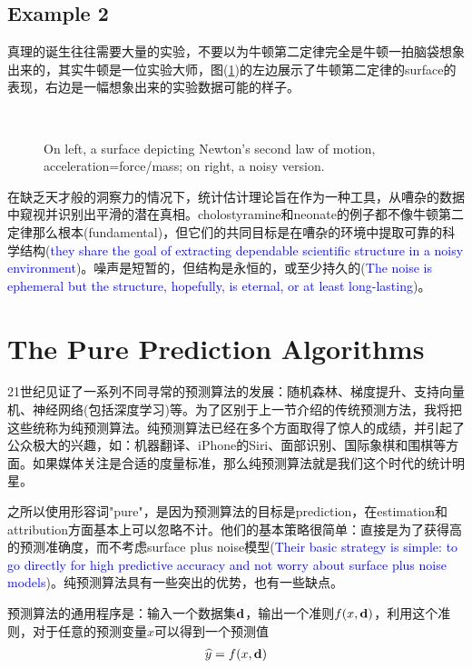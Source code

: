 \documentclass[lang=cn,11pt,a4paper,cite=authoryear]{elegantpaper}
\begin{document}
\subsection{Example 2}
真理的诞生往往需要大量的实验，不要以为牛顿第二定律完全是牛顿一拍脑袋想象出来的，其实牛顿是一位实验大师，图(\ref{fig2})的左边展示了牛顿第二定律的surface的表现，右边是一幅想象出来的实验数据可能的样子。
\begin{figure}[H]
		\centering
		\\
		\caption{On left, a surface depicting Newton's second law of motion, acceleration=force/mass; on right, a noisy version.}
		\label{fig2}
\end{figure}

在缺乏天才般的洞察力的情况下，统计估计理论旨在作为一种工具，从嘈杂的数据中窥视并识别出平滑的潜在真相。cholostyramine和neonate的例子都不像牛顿第二定律那么根本(fundamental)，但它们的共同目标是在嘈杂的环境中提取可靠的科学结构(\textcolor{blue}{they share the goal of extracting dependable scientific structure in a noisy environment})。噪声是短暂的，但结构是永恒的，或至少持久的(\textcolor{blue}{The noise is ephemeral but the structure, hopefully, is eternal, or at least long-lasting})。

\section{The Pure Prediction Algorithms}

21世纪见证了一系列不同寻常的预测算法的发展：随机森林、梯度提升、支持向量机、神经网络(包括深度学习)等。为了区别于上一节介绍的传统预测方法，我将把这些统称为纯预测算法。纯预测算法已经在多个方面取得了惊人的成绩，并引起了公众极大的兴趣，如：机器翻译、iPhone的Siri、面部识别、国际象棋和围棋等方面。如果媒体关注是合适的度量标准，那么纯预测算法就是我们这个时代的统计明星。

之所以使用形容词"pure"，是因为预测算法的目标是prediction，在estimation和attribution方面基本上可以忽略不计。他们的基本策略很简单：直接是为了获得高的预测准确度，而不考虑surface plus noise模型(\textcolor{blue}{Their basic strategy is simple: to go directly for high predictive accuracy and not worry about surface plus noise models})。纯预测算法具有一些突出的优势，也有一些缺点。

预测算法的通用程序是：输入一个数据集$\bold{d}$，输出一个准则$f(x, \bold{d})$，利用这个准则，对于任意的预测变量$x$可以得到一个预测值
\begin{align}
	\widehat{y} = f(x, \bold{d})
\end{align}
\end{document}
